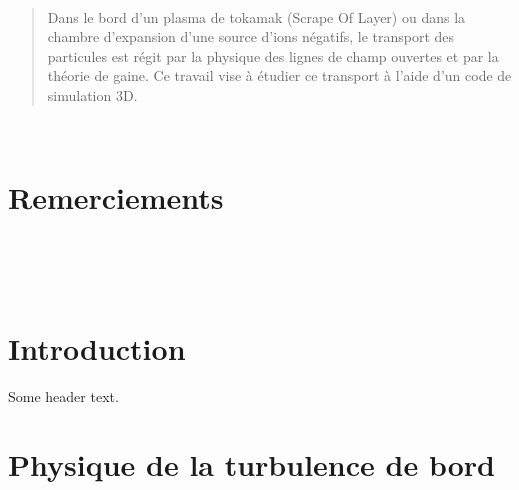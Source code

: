 \documentclass[12pt]{article}
\begin{document}
	\thispagestyle{empty} 
	~\newpage
	\setcounter{page}{1}
	\vspace*{-110pt}
	\renewcommand{\abstractname}{Abstract}
	\begin{abstract}
		
	\end{abstract}
	\vfill
	\renewcommand{\abstractname}{Résumé}
	\begin{abstract}
		Dans le bord d'un plasma de tokamak (Scrape Of Layer) 
		ou dans la chambre d'expansion d'une source d'ions négatifs,
		le transport des particules est régit par la physique des
		lignes de champ ouvertes et par la théorie de gaine.
		Ce travail vise à étudier ce transport à l'aide d'un code 
		de simulation 3D.
	\end{abstract}
	\vfill
	\newpage
	\thispagestyle{empty}
	~\newpage
	\setcounter{page}{2}
	\vfill
	\vspace*{20pt}
	\section*{\center Remerciements}
	
	~\\
	\vfill
	\newpage
	
	\thispagestyle{empty} 
	~\newpage
	\tableofcontents
	\thispagestyle{empty} 
	\setcounter{page}{0}
	\newpage
	
	
	\section*{Introduction}
	
	\begin{header}
		Some header text.    
	\end{header}	
	
	\newpage
	
\section{Physique de la turbulence de bord}
\end{document}
